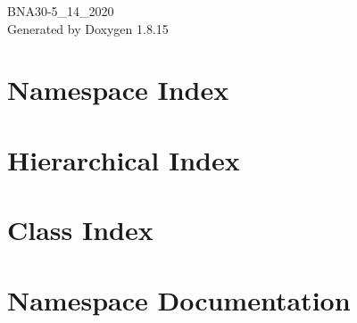 \let\mypdfximage\pdfximage\def\pdfximage{\immediate\mypdfximage}\documentclass[twoside]{book}
\newcommand{\+}{\discretionary{\mbox{\scriptsize$\hookleftarrow$}}{}{}}
\newcommand{\clearemptydoublepage}{%
  \newpage{\pagestyle{empty}\cleardoublepage}%
}
\begin{document}
\hypersetup{pageanchor=false,
             bookmarksnumbered=true,
             pdfencoding=unicode
            }
\begin{titlepage}
\vspace*{7cm}
\begin{center}%
{\Large B\+N\+A30-\/5\+\_\+14\+\_\+2020 }\\
\vspace*{1cm}
{\large Generated by Doxygen 1.8.15}\\
\end{center}
\end{titlepage}
\clearemptydoublepage
{}
\tableofcontents
\clearemptydoublepage
{}
\hypersetup{pageanchor=true}

\chapter{Namespace Index}

\chapter{Hierarchical Index}

\chapter{Class Index}

\chapter{Namespace Documentation}












\end{document}
